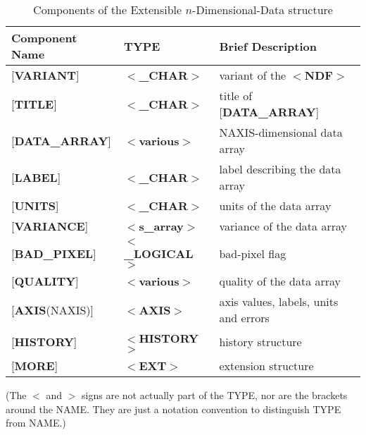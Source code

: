 \documentclass[twoside,11pt]{article}
\begin{document}
\begin{table}[htb]
\centering
\caption{Components of the Extensible $n$-Dimensional-Data
structure}
\label{ta:example1}
\begin{tabular}{|l|l|l|}
\hline
Component Name & TYPE & Brief Description \\ \hline
{[}{\bf VARIANT}{]} & $<${\bf \_CHAR}$>$ & variant of the $<${\bf NDF}$>$ \\
{[}{\bf TITLE}{]} & $<${\bf \_CHAR}$>$ & title of {[}{\bf DATA\_ARRAY}{]} \\
{[}{\bf DATA\_ARRAY}{]} & $<${\bf various}$>$ & NAXIS-dimensional data array \\
{[}{\bf LABEL}{]} & $<${\bf \_CHAR}$>$ & label describing the data array \\
{[}{\bf UNITS}{]} & $<${\bf \_CHAR}$>$ & units of the data array \\
{[}{\bf VARIANCE}{]} & $<${\bf s\_array}$>$ & variance of the data array \\
{[}{\bf BAD\_PIXEL}{]} & $<${\bf \_LOGICAL}$>$ & bad-pixel flag \\
{[}{\bf QUALITY}{]} & $<${\bf various}$>$ & quality of the data array \\
{[}{\bf AXIS}(NAXIS){]} & $<${\bf AXIS}$>$ & axis values, labels, units and errors \\
{[}{\bf HISTORY}{]} & $<${\bf HISTORY}$>$ & history structure \\ 
{[}{\bf MORE}{]} & $<${\bf EXT}$>$ & extension structure \\ \hline
\end{tabular}
\end{table}

(The $<$ and $>$ signs
are not actually part of the TYPE, 
nor are the brackets around the NAME.  They are
just a notation convention
to distinguish TYPE from NAME.)
\end{document}
